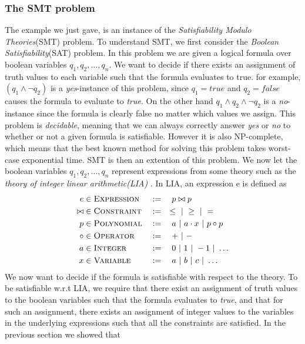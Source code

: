 	\subsubsection{The SMT problem}

	The example we just gave, is an instance of the \emph{Satisfiability Modulo Theories}(SMT) problem. To understand SMT, we first consider the \emph{Boolean Satisfiability}(SAT) problem. In this problem we are given a logical formula over boolean variables $q_1, q_2, \ldots, q_n$. We want to decide if there exists an assignment of truth values to each variable such that the formula evaluates to true. for example, $(q_1 \land \neg q_2)$ is a \emph{yes}-instance of this problem, since $q_1 = true$ and $q_2 = false$ causes the formula to evaluate to \emph{true}. On the other hand $q_1 \land q_2 \land \neg q_2$ is a \emph{no}-instance since the formula is clearly false no matter which values we assign. This problem is \emph{decidable}, meaning that we can always correctly answer \emph{yes} or \emph{no} to whether or not a given formula is satisfiable. However it is also NP-complete, which means that the best known method for solving this problem takes worst-case exponential time. SMT is then an extention of this problem. We now let the boolean variables $q_1, q_2, \ldots, q_n$ represent expressions from some theory such as the \emph{theory of integer linear arithmetic(LIA)} \cite{DeMoura2011}. In LIA, an expression e is defined as 
		\begin{alignat*}{3}
			e & \in \textsc{Expression} && := \quad p \bowtie p\\
			\bowtie & \in \textsc{Constraint} && := \quad \leq \ | \  \geq \ | \  =\\
			p & \in \textsc{Polynomial} && := \quad a \ | \  a\cdot x \ | \  p \circ p\\
			\circ & \in \textsc{Operator} && := \quad + \ | \  - \\
			a & \in \textsc{Integer} && := \quad 0 \ | \  1 \ | \  -1 \ | \  \ldots\\ 
			x & \in \textsc{Variable} && := \quad a \ | \  b \ | \  c \ | \  \ldots		
		\end{alignat*} 
	We now want to decide if the formula is satisfiable with respect to the theory. To be satisfiable w.r.t LIA, we require that there exist an assignment of truth values to the boolean variables such that the formula evaluates to \emph{true}, and that for such an assignment, there exists an assignment of integer values to the variables in the underlying expressions such that all the constraints are satisfied. In the previous section we showed that 
	
